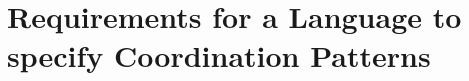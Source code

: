\chapter{Requirements for a Language to specify Coordination Patterns}
\label{ch:framework}









 
